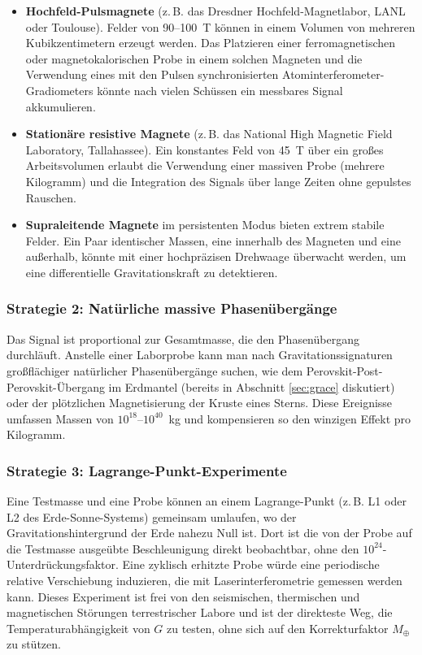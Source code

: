 \documentclass[12pt]{article}
\theoremstyle{remark}
\begin{document}
	\begin{itemize}
		\item \textbf{Hochfeld-Pulsmagnete} (z. B. das Dresdner Hochfeld-Magnetlabor, LANL oder Toulouse). Felder von 90–100~T können in einem Volumen von mehreren Kubikzentimetern erzeugt werden. Das Platzieren einer ferromagnetischen oder magnetokalorischen Probe in einem solchen Magneten und die Verwendung eines mit den Pulsen synchronisierten Atominterferometer-Gradiometers könnte nach vielen Schüssen ein messbares Signal akkumulieren.
		\item \textbf{Stationäre resistive Magnete} (z. B. das National High Magnetic Field Laboratory, Tallahassee). Ein konstantes Feld von 45~T über ein großes Arbeitsvolumen erlaubt die Verwendung einer massiven Probe (mehrere Kilogramm) und die Integration des Signals über lange Zeiten ohne gepulstes Rauschen.
		\item \textbf{Supraleitende Magnete} im persistenten Modus bieten extrem stabile Felder. Ein Paar identischer Massen, eine innerhalb des Magneten und eine außerhalb, könnte mit einer hochpräzisen Drehwaage überwacht werden, um eine differentielle Gravitationskraft zu detektieren.
	\end{itemize}
	
	\subsubsection*{Strategie 2: Natürliche massive Phasenübergänge}
	Das Signal ist proportional zur Gesamtmasse, die den Phasenübergang durchläuft. Anstelle einer Laborprobe kann man nach Gravitationssignaturen großflächiger natürlicher Phasenübergänge suchen, wie dem Perovskit-Post-Perovskit-Übergang im Erdmantel (bereits in Abschnitt \ref{sec:grace} diskutiert) oder der plötzlichen Magnetisierung der Kruste eines Sterns. Diese Ereignisse umfassen Massen von $10^{18}$–$10^{40}$~kg und kompensieren so den winzigen Effekt pro Kilogramm.
	
	\subsubsection*{Strategie 3: Lagrange-Punkt-Experimente}
	Eine Testmasse und eine Probe können an einem Lagrange-Punkt (z. B. L1 oder L2 des Erde-Sonne-Systems) gemeinsam umlaufen, wo der Gravitationshintergrund der Erde nahezu Null ist. Dort ist die von der Probe auf die Testmasse ausgeübte Beschleunigung direkt beobachtbar, ohne den $10^{24}$-Unterdrückungsfaktor. Eine zyklisch erhitzte Probe würde eine periodische relative Verschiebung induzieren, die mit Laserinterferometrie gemessen werden kann. Dieses Experiment ist frei von den seismischen, thermischen und magnetischen Störungen terrestrischer Labore und ist der direkteste Weg, die Temperaturabhängigkeit von $G$ zu testen, ohne sich auf den Korrekturfaktor $M_\oplus$ zu stützen.
	
\end{document}
